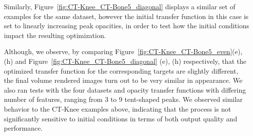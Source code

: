 Similarly, Figure~\ref{fig:CT-Knee_CT-Bone5_diagonal} displays a similar set of examples for the same dataset, however the initial transfer function in this case is set to linearly increasing peak opacities, in order to test how the initial conditions impact the resulting optimization.


Although, we observe, by comparing Figure~\ref{fig:CT-Knee_CT-Bone5_even}(e), (h) and  Figure~\ref{fig:CT-Knee_CT-Bone5_diagonal} (e), (h) respectively, that the optimized transfer function for the corresponding targets are slightly different, the final volume rendered images turn out to be very similar in appearance. We also ran tests with the four datasets and opacity transfer functions with differing number of features, ranging from 3 to 9 tent-shaped peaks. We observed similar behavior to the CT-Knee examples above, indicating that the process is not significantly sensitive to initial conditions in terms of both output quality and performance.
%

